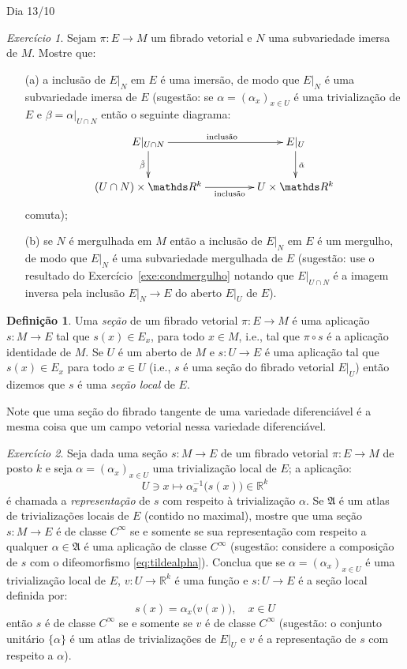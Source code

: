 \documentclass[oneside,11pt]{amsart}
\newcommand{\R}{\mathds R}
\theoremstyle{remark}\newtheorem{exercise}{Exercício}[section]
\theoremstyle{plain}\newtheorem{teo}{Teorema}[section]
\theoremstyle{plain}\newtheorem{lem}[teo]{Lema}
\theoremstyle{plain}\newtheorem{prop}[teo]{Proposição}
\theoremstyle{definition}\newtheorem{defin}[teo]{Definição}
\theoremstyle{remark}\newtheorem{rem}[teo]{Observação}
\theoremstyle{definition}\newtheorem{example}[teo]{Exemplo}
\numberwithin{equation}{section}
\begin{document}
\begin{section}{Dia 13/10}
\begin{exercise}
Sejam $\pi:E\to M$ um fibrado vetorial e $N$ uma subvariedade imersa de $M$. Mostre que:
\begin{itemize}
\item[(a)] a inclusão de $E\vert_N$ em $E$ é uma imersão, de modo que $E\vert_N$ é uma subvariedade imersa de $E$ (sugestão: se $\alpha=(\alpha_x)_{x\in U}$
é uma trivialização de $E$ e $\beta=\alpha\vert_{U\cap N}$ então o seguinte diagrama:
\[\xymatrix@C+20pt{%
E\vert_{U\cap N}\ar[r]^{\text{inclusão}}\ar[d]_{\tilde\beta}&E\vert_U\ar[d]^{\tilde\alpha}\\
(U\cap N)\times\R^k\ar[r]_-{\text{inclusão}}&U\times\R^k}\]
comuta);
\item[(b)] se $N$ é mergulhada em $M$ então a inclusão de $E\vert_N$ em $E$ é um mergulho, de modo que $E\vert_N$ é uma subvariedade mergulhada de $E$
(sugestão: use o resultado do Exercício~\ref{exe:condmergulho} notando que $E\vert_{U\cap N}$ é a imagem inversa pela inclusão $E\vert_N\to E$
do aberto $E\vert_U$ de $E$).
\end{itemize}
\end{exercise}

\begin{defin}
Uma {\em seção\/} de um fibrado vetorial $\pi:E\to M$ é uma aplicação $s:M\to E$ tal que $s(x)\in E_x$, para todo $x\in M$, i.e., tal que $\pi\circ s$
é a aplicação identidade de $M$. Se $U$ é um aberto de $M$ e $s:U\to E$ é uma aplicação tal que $s(x)\in E_x$ para todo $x\in U$ (i.e., $s$ é uma seção
do fibrado vetorial $E\vert_U$) então dizemos que $s$ é uma {\em seção local\/} de $E$.
\end{defin}
Note que uma seção do fibrado tangente de uma variedade diferenciável é a mesma coisa que um campo vetorial nessa variedade diferenciável.

\begin{exercise}\label{exe:reprsecao}
Seja dada uma seção $s:M\to E$ de um fibrado vetorial $\pi:E\to M$ de posto $k$ e seja $\alpha=(\alpha_x)_{x\in U}$ uma trivialização local de $E$; a aplicação:
\[U\ni x\longmapsto\alpha_x^{-1}\big(s(x)\big)\in\R^k\]
é chamada a {\em representação\/} de $s$ com respeito à trivialização $\alpha$. Se $\mathfrak A$ é um atlas de trivializações locais de $E$ (contido no
maximal), mostre que uma seção $s:M\to E$ é de classe $C^\infty$ se e somente se sua representação com respeito a qualquer $\alpha\in\mathfrak A$ é uma aplicação
de classe $C^\infty$ (sugestão: considere a composição de $s$ com o difeomorfismo \eqref{eq:tildealpha}). Conclua que se $\alpha=(\alpha_x)_{x\in U}$
é uma trivialização local de $E$, $v:U\to\R^k$ é uma função e $s:U\to E$ é a seção local definida por:
\[s(x)=\alpha_x\big(v(x)\big),\quad x\in U\]
então $s$ é de classe $C^\infty$ se e somente se $v$ é de classe $C^\infty$ (sugestão: o conjunto unitário $\{\alpha\}$ é um atlas de trivializações de $E\vert_U$ e
$v$ é a representação de $s$ com respeito a $\alpha$).
\end{exercise}


\end{section}
\end{document}
